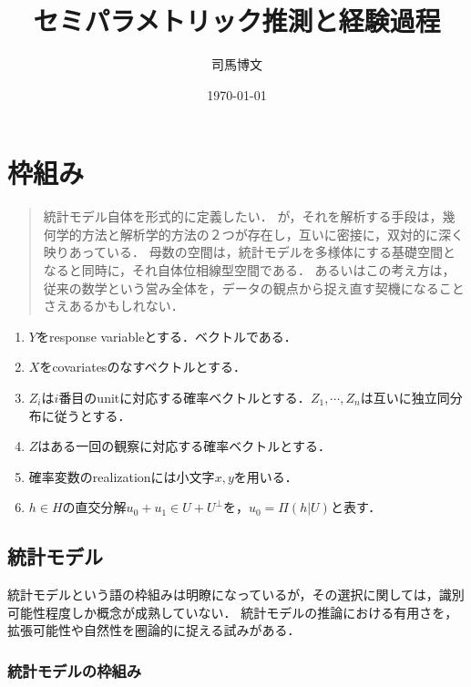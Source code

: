 \documentclass[uplatex,dvipdfmx]{jsreport}
\title{セミパラメトリック推測と経験過程}
\author{司馬博文}
\date{\today}
\begin{document}
\tableofcontents

\chapter{枠組み}

\begin{quotation}
    統計モデル自体を形式的に定義したい．
    が，それを解析する手段は，幾何学的方法と解析学的方法の２つが存在し，互いに密接に，双対的に深く映りあっている．
    母数の空間は，統計モデルを多様体にする基礎空間となると同時に，それ自体位相線型空間である．
    あるいはこの考え方は，従来の数学という営み全体を，データの観点から捉え直す契機になることさえあるかもしれない．
\end{quotation}

\begin{notation}
    \begin{enumerate}
        \item $Y$をresponse variableとする．ベクトルである．
        \item $X$をcovariatesのなすベクトルとする．
        \item $Z_i$は$i$番目のunitに対応する確率ベクトルとする．$Z_1,\cdots,Z_n$は互いに独立同分布に従うとする．
        \item $Z$はある一回の観察に対応する確率ベクトルとする．
        \item 確率変数のrealizationには小文字$x,y$を用いる．
        \item $h\in H$の直交分解$u_0+u_1\in U+U^\perp$を，$u_0=\Pi(h|U)$と表す．
    \end{enumerate}
\end{notation}

\section{統計モデル}

\begin{tcolorbox}[colframe=ForestGreen, colback=ForestGreen!10!white,breakable,colbacktitle=ForestGreen!40!white,coltitle=black,fonttitle=\bfseries\sffamily,
title=]
    統計モデルという語の枠組みは明瞭になっているが，その選択に関しては，識別可能性程度しか概念が成熟していない．
    統計モデルの推論における有用さを，拡張可能性や自然性を圏論的に捉える試みがある．
\end{tcolorbox}

\subsection{統計モデルの枠組み}
\end{document}
